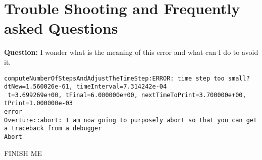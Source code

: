 \documentclass{article}
\newcommand{\bogus}[1]{}  %
\begin{document}
\section{Trouble Shooting and Frequently asked Questions}

{\bf Question:} I wonder what is the meaning of this error and what can I do to avoid it.
\begin{verbatim}
computeNumberOfStepsAndAdjustTheTimeStep:ERROR: time step too small? dtNew=1.560026e-61, timeInterval=7.314242e-04
 t=3.699269e+00, tFinal=6.000000e+00, nextTimeToPrint=3.700000e+00, tPrint=1.000000e-03
error
Overture::abort: I am now going to purposely abort so that you can get a traceback from a debugger
Abort
\end{verbatim}

FINISH ME

\clearpage



\bogus{
\subsection{Using PETSc and cgcssi}\index{PETSc}

  PETSc, the Portable Extensible Toolkit for Scientific computations\cite{petsc-manual},
can be used in cgcssi to solve implicit systems. 

To use PETSc you should 
\begin{enumerate}
 \item build  PETSc on your machine.
\item define the PETSC\_LIB and PETSC\_ARCH environmental variables (as required to use PETSc normally).
\item edit the file {\tt cg/ins/Makfile} and turn on the PETSc option. 
\end{enumerate}
}

\vfill\eject



\printindex
\end{document}
